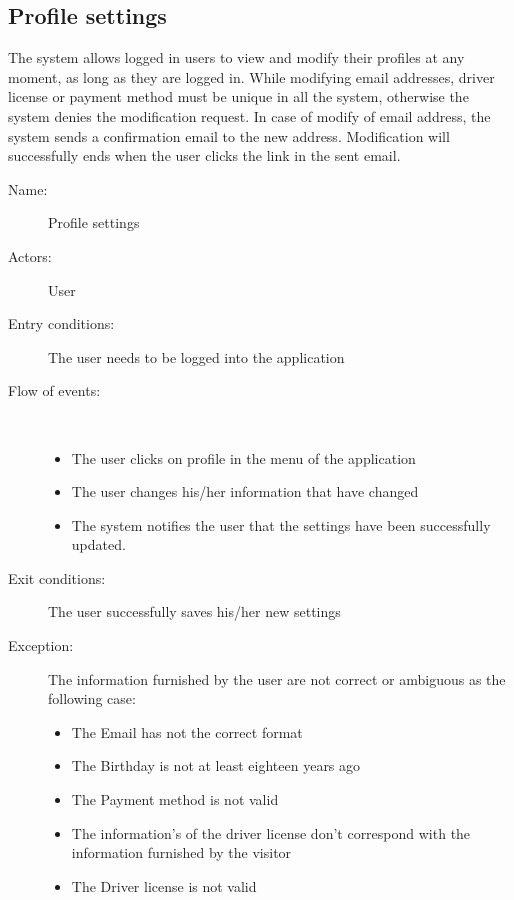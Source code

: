 \subsection{Profile settings}
The system allows logged in users to view and modify their profiles at any moment, as long as they are logged in. While modifying email addresses, driver license or payment method must be unique in all the system, otherwise the system denies the modification request. In case of modify of email address, the system sends a confirmation email to the new address. Modification will successfully ends when the user clicks the link in the sent email.
\begin{description}
	\item[Name:] Profile settings
	\item[Actors:] User
	\item[Entry conditions:] The user needs to be logged into the application
	\item[Flow of events:]  \ \\
		\begin{itemize}
			\item The user clicks on profile in the menu of the application
			\item The user changes his/her information that have changed
			\item The system notifies the user that the settings have been successfully updated.
		\end{itemize}
	\item[Exit conditions:] The user successfully saves his/her new settings
	\item [Exception:] The information furnished by the user are not correct or ambiguous as the following case:
		\begin{itemize}
			\item The Email has not the correct format
			\item The Birthday is not at least eighteen years ago
			\item The Payment method is not valid
			\item The information's of the driver license don't correspond with the information furnished by the visitor
			\item The Driver license is not valid
		\end {itemize}
\end{description}
 \ \\
